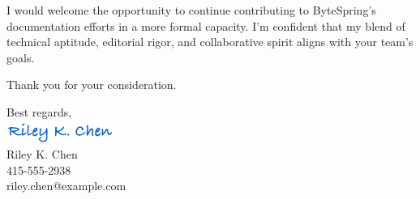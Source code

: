 \documentclass[12pt]{article}
\begin{document}
I would welcome the opportunity to continue contributing to ByteSpring's
documentation efforts in a more formal capacity. I’m confident that my blend of
technical aptitude, editorial rigor, and collaborative spirit aligns with your
team’s goals.

Thank you for your consideration.

\begin{flushleft}
  Best regards,\\  \vspace{1ex}
  \includegraphics[height=2em]{example_signature.png}\\  \vspace{1ex}
  Riley K. Chen\\415-555-2938\\riley.chen@example.com
\end{flushleft}
\end{document}
